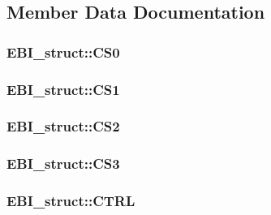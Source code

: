 \subsection{Member Data Documentation}
\hypertarget{struct_e_b_i__struct_a04638b6a0b7d3c2095743a7169c07cbc}{
\subsubsection[{CS0}]{ {\bf EBI\_\-struct::CS0}}}
\label{struct_e_b_i__struct_a04638b6a0b7d3c2095743a7169c07cbc}
\hypertarget{struct_e_b_i__struct_a02c4957bc029280861445d74b4e52997}{
\subsubsection[{CS1}]{ {\bf EBI\_\-struct::CS1}}}
\label{struct_e_b_i__struct_a02c4957bc029280861445d74b4e52997}
\hypertarget{struct_e_b_i__struct_a7d6fb6fedf5796f22703f1cd96b6c9ff}{
\subsubsection[{CS2}]{ {\bf EBI\_\-struct::CS2}}}
\label{struct_e_b_i__struct_a7d6fb6fedf5796f22703f1cd96b6c9ff}
\hypertarget{struct_e_b_i__struct_aa77a84b45143626fd5677f6392e46b8b}{
\subsubsection[{CS3}]{ {\bf EBI\_\-struct::CS3}}}
\label{struct_e_b_i__struct_aa77a84b45143626fd5677f6392e46b8b}
\hypertarget{struct_e_b_i__struct_a81307deedc46263ebefbf6dfa9822545}{
\subsubsection[{CTRL}]{ {\bf EBI\_\-struct::CTRL}}}
